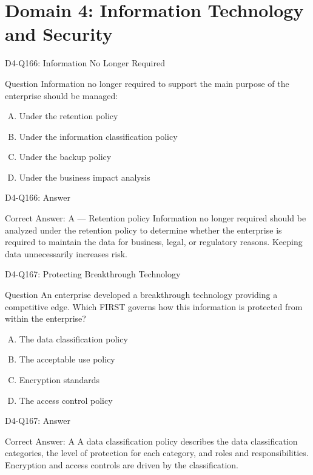 \documentclass{beamer}
\begin{document}
	\section{Domain 4: Information Technology and Security}
	
	\begin{frame}{D4-Q166: Information No Longer Required}
		\begin{block}{Question}
			Information no longer required to support the main purpose of the enterprise should be managed:
		\end{block}
		\begin{enumerate}[(A)]
			\item Under the retention policy
			\item Under the information classification policy
			\item Under the backup policy
			\item Under the business impact analysis
		\end{enumerate}
	\end{frame}
	\begin{frame}{D4-Q166: Answer}
		\begin{block}{Correct Answer: A --- Retention policy}
			Information no longer required should be analyzed under the retention policy to determine whether the enterprise is required to maintain the data for business, legal, or regulatory reasons. Keeping data unnecessarily increases risk.
		\end{block}
	\end{frame}
	
	\begin{frame}{D4-Q167: Protecting Breakthrough Technology}
		\begin{block}{Question}
			An enterprise developed a breakthrough technology providing a competitive edge. Which FIRST governs how this information is protected from within the enterprise?
		\end{block}
		\begin{enumerate}[(A)]
			\item The data classification policy
			\item The acceptable use policy
			\item Encryption standards
			\item The access control policy
		\end{enumerate}
	\end{frame}
	\begin{frame}{D4-Q167: Answer}
		\begin{block}{Correct Answer: A}
			A data classification policy describes the data classification categories, the level of protection for each category, and roles and responsibilities. Encryption and access controls are driven by the classification.
		\end{block}
	\end{frame}
	
\end{document}
